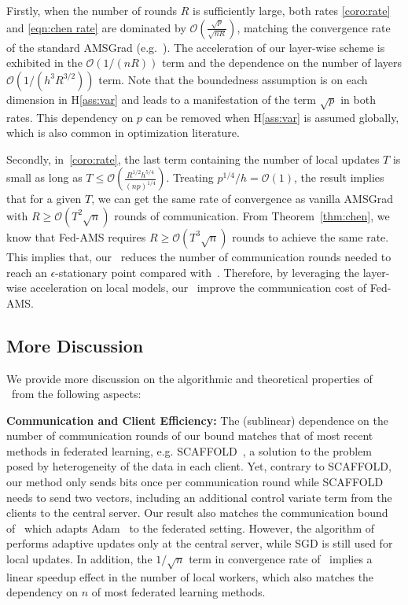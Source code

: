 \documentclass[manuscript,screen,review]{acmart}
\begin{document}
\vspace{0.2in}

Firstly, when the number of rounds $R$ is sufficiently large, both rates \eqref{coro:rate} and \eqref{eqn:chen rate} are dominated by $\mathcal O(\frac{\sqrt p}{\sqrt{n R}})$, matching the convergence rate of the standard AMSGrad (e.g.~\cite{Arxiv:Zhou_18}).
The acceleration of our layer-wise scheme is exhibited in the $\mathcal O(1/(n R))$ term and the dependence on the number of layers $\mathcal O(1/(h^3 R^{3/2}))$ term. Note that the boundedness assumption is on each dimension in H\ref{ass:var} and leads to a manifestation of the term $\sqrt{p}$ in both rates. This dependency on $p$ can be removed when H\ref{ass:var} is assumed globally, which is also common in optimization literature.

Secondly, in~\eqref{coro:rate}, the last term containing the number of local updates $T$ is small as long as $T\leq \mathcal O(\frac{R^{1/2}h^{5/4}}{(np)^{1/4}})$. 
Treating $p^{1/4}/h=\mathcal O(1)$, the result implies that for a given $T$, we can get the same rate of convergence as vanilla AMSGrad with $R\geq \mathcal{O}(T^2\sqrt n)$ rounds of communication. From Theorem~\ref{thm:chen}, we know that Fed-AMS requires $R\geq \mathcal O(T^3\sqrt n)$ rounds to achieve the same rate. This implies that, our \algo\ reduces the number of communication rounds needed to reach an $\epsilon$-stationary point compared with~\cite{chen2020toward}. Therefore, by leveraging the layer-wise acceleration on local models, our \algo\ improve the communication cost of Fed-AMS.


\vspace{0.1in}

\subsection{More Discussion}

We provide more discussion on the algorithmic and theoretical properties of \algo\ from the following aspects:


\vspace{0.1in}
\noindent\textbf{Communication and Client Efficiency:} The (sublinear) dependence on the number of communication rounds of our bound matches that of most recent methods in federated learning, e.g. SCAFFOLD~\citep{karimireddy2019scaffold}, a solution to the problem posed by heterogeneity of the data in each client. Yet, contrary to SCAFFOLD, our method only sends bits once per communication round while SCAFFOLD needs to send two vectors, including an additional control variate term  from the clients to the central server. Our result also matches the communication bound of~\cite{reddi2020adaptive} which adapts Adam~\citep{KB15} to the federated setting. However, the algorithm of~\cite{reddi2020adaptive} performs adaptive updates only at the central server, while SGD is still used for local updates. In addition, the $1/\sqrt n$ term in convergence rate of \algo\ implies a linear speedup effect in the number of local workers, which also matches the dependency on $n$ of most federated learning methods. 
\end{document}
